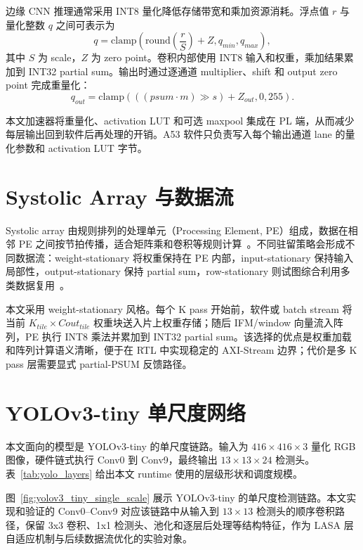 边缘 CNN 推理通常采用 INT8 量化降低存储带宽和乘加资源消耗。浮点值 $r$ 与量化整数 $q$ 之间可表示为~\cite{jacob2018quantization}
\begin{equation}
q=\mathrm{clamp}\left(\mathrm{round}\left(\frac{r}{S}\right)+Z,q_{min},q_{max}\right),
\label{eq:quant}
\end{equation}
其中 $S$ 为 scale，$Z$ 为 zero point。卷积内部使用 INT8 输入和权重，乘加结果累加到 INT32 partial sum。输出时通过逐通道 multiplier、shift 和 output zero point 完成重量化：
\begin{equation}
q_{out}=\mathrm{clamp}\left(\left((psum \cdot m) \gg s\right)+Z_{out},0,255\right).
\label{eq:requant}
\end{equation}

本文加速器将重量化、activation LUT 和可选 maxpool 集成在 PL 端，从而减少每层输出回到软件后再处理的开销。A53 软件只负责写入每个输出通道 lane 的量化参数和 activation LUT 字节。

\section{Systolic Array 与数据流}

Systolic array 由规则排列的处理单元（Processing Element, PE）组成，数据在相邻 PE 之间按节拍传播，适合矩阵乘和卷积等规则计算~\cite{kung1982systolic}。不同驻留策略会形成不同数据流：weight-stationary 将权重保持在 PE 内部，input-stationary 保持输入局部性，output-stationary 保持 partial sum，row-stationary 则试图综合利用多类数据复用~\cite{sze2017efficient,chen2016eyeriss}。

本文采用 weight-stationary 风格。每个 K pass 开始前，软件或 batch stream 将当前 $K_{tile}\times Cout_{tile}$ 权重块送入片上权重存储；随后 IFM/window 向量流入阵列，PE 执行 INT8 乘法并累加到 INT32 partial sum。该选择的优点是权重加载和阵列计算语义清晰，便于在 RTL 中实现稳定的 AXI-Stream 边界；代价是多 K pass 层需要显式 partial-PSUM 反馈路径。

\section{YOLOv3-tiny 单尺度网络}

本文面向的模型是 YOLOv3-tiny 的单尺度链路。输入为 $416\times416\times3$ 量化 RGB 图像，硬件链式执行 Conv0 到 Conv9，最终输出 $13\times13\times24$ 检测头。表~\ref{tab:yolo_layers} 给出本文 runtime 使用的层级形状和调度规模。

图~\ref{fig:yolov3_tiny_single_scale} 展示 YOLOv3-tiny 的单尺度检测链路。本文实现和验证的 Conv0--Conv9 对应该链路中从输入到 $13\times13$ 检测头的顺序卷积路径，保留 3x3 卷积、1x1 检测头、池化和逐层后处理等结构特征，作为 LASA 层自适应机制与后续数据流优化的实验对象。

